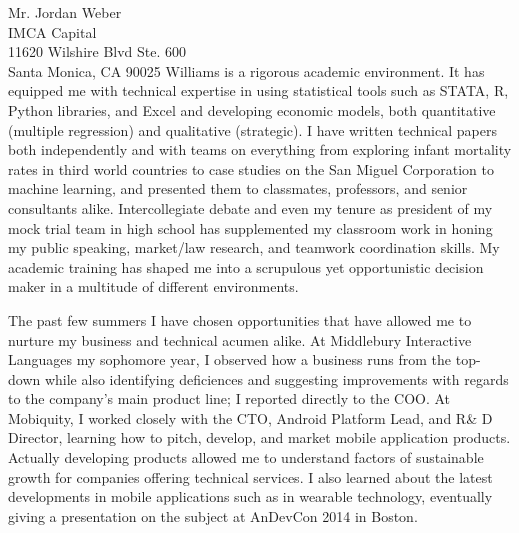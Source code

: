 \documentclass[11pt]{letter} %
\newcommand{\forceindent}{\leavevmode{\parindent=24pt\indent}}
\begin{document}
\begin{letter}{Mr. Jordan Weber \\
IMCA Capital \\
11620 Wilshire Blvd Ste. 600 \\
Santa Monica, CA 90025}
\forceindent Williams is a rigorous academic environment. It has equipped me with technical expertise in using statistical tools such as STATA, R, Python libraries, and Excel and developing economic models, both quantitative (multiple regression) and qualitative (strategic). I have written technical papers both independently and with teams on everything from exploring infant mortality rates in third world countries to case studies on the San Miguel Corporation to machine learning, and presented them to classmates, professors, and senior consultants alike. Intercollegiate debate and even my tenure as president of my mock trial team in high school has supplemented my classroom work in honing my public speaking, market/law research, and teamwork coordination skills. My academic training has shaped me into a scrupulous yet opportunistic decision maker in a multitude of different environments.


\forceindent The past few summers I have chosen opportunities that have allowed me to nurture my business and technical acumen alike. At  Middlebury Interactive Languages my sophomore year, I observed how a business runs from the top-down while also identifying deficiences and suggesting improvements with regards to the company's main product line; I reported directly to the COO. At Mobiquity, I worked closely with the CTO, Android Platform Lead, and R\& D Director, learning how to pitch, develop, and market mobile application products. Actually developing products allowed me to understand factors of sustainable growth for companies offering technical services. I also learned about the latest developments in mobile applications such as in wearable technology, eventually giving a presentation on the subject at AnDevCon 2014 in Boston. 



\end{letter}
\end{document}
